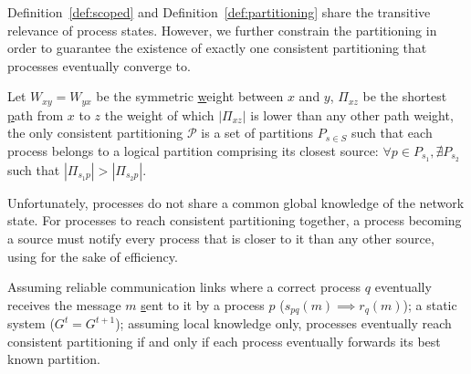 Definition~\ref{def:scoped} and Definition~\ref{def:partitioning}
share the transitive relevance of process states. However, we further
constrain the partitioning in order to guarantee the existence of
exactly one consistent partitioning that processes eventually converge
to.

\begin{definition}
  Let $W_{xy} = W_{yx}$ be the symmetric \underline{w}eight between
  $x$ and $y$, $\Pi_{xz}$ be the shortest \underline{p}ath from $x$ to
  $z$ the weight of which $|\Pi_{xz}|$ is lower than any other path
  weight, the only consistent partitioning $\mathcal{P}$ is a set of
  partitions $P_{s\in S}$ such that each process belongs to a logical
  partition comprising its closest source: $\forall p \in P_{s_1},
  \nexists P_{s_2}$ such that $|\Pi_{s_1p}| > |\Pi_{s_2p}|$.
\end{definition}

Unfortunately, processes do not share a common global knowledge of the
network state. For processes to reach consistent partitioning
together, a process becoming a source must notify every process that
is closer to it than any other source, using \NAMEB for the sake of
efficiency.

\begin{theorem}
  Assuming reliable communication links where a correct process $q$
  eventually receives the message $m$ \underline{s}ent to it by a
  process $p$ ($s_{pq}(m) \implies r_{q}(m)$); a static system ($G^t =
  G^{t+1}$); assuming local knowledge only, processes eventually reach
  consistent partitioning if and only if each process eventually
  forwards its best known partition.
\end{theorem}


